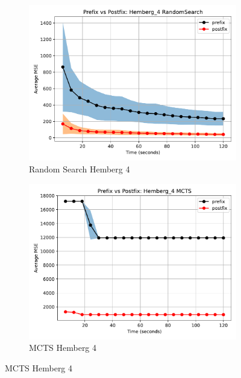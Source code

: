 \documentclass[12pt]{iopart}
\begin{document}
\begin{figure}
    \centering
    
    \begin{subfigure}[b]{0.4\textwidth}
        \includegraphics[width=\linewidth, keepaspectratio]{Hemberg_Benchmarks/PrePostHemberg_4RandomSearch.pdf}
        \caption{Random Search Hemberg 4}
        \label{subfig:hemberg_4_RS}
    \end{subfigure}
    \begin{subfigure}[b]{0.4\textwidth}
        \includegraphics[width=\linewidth, keepaspectratio]{Hemberg_Benchmarks/PrePostHemberg_4MCTS.pdf}
        \caption{MCTS Hemberg 4}
        \label{subfig:hemberg_4_MCTS}
    \end{subfigure}
    

\end{figure}
\end{document}
